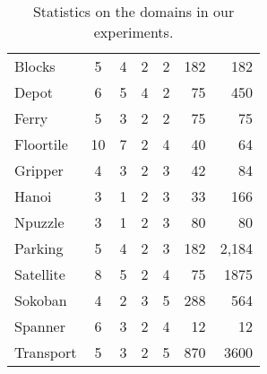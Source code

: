\documentclass{article}
\newcommand{\tuple}[1]{\ensuremath{\left \langle #1 \right \rangle }}
\begin{document}
\begin{table}[t]
{\begin{tabular}{lccccrr}
Blocks      & 5                 & 4                 &2                  &2  & 182 & 182                  \\
Depot      & 6                 & 5                 &4                  &2  & 75 & 450                  \\
Ferry       & 5                 & 3                 &2                  &2& 75 & 75                    \\
Floortile   & 10                & 7                 &2                  &4 & 40 & 64                   \\
Gripper     & 4                 & 3                 &2                  &3& 42 & 84                    \\
Hanoi       & 3                 & 1                 &2                  &3& 33 & 166                    \\
Npuzzle     & 3                 & 1                 &2                  &3& 80 & 80                    \\
Parking     & 5                 & 4                 &2                  &3  & 182 & 2,184                  \\
Satellite      & 8                 & 5                 &2                  &4  & 75 & 1875                  \\
Sokoban     & 4                 & 2                 &3                  &5& 288 & 564                    \\
Spanner     & 6                 & 3                 &2                  &4  & 12 & 12                  \\
Transport      & 5                 & 3                 &2                  &5  & 870 &  3600                \\

\bottomrule
\end{tabular}
}
\caption{Statistics on the domains in our experiments.}
\label{tab:domains}
\end{table}



\end{document}
